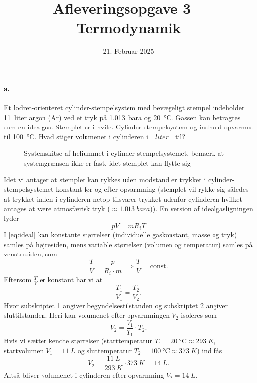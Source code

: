 \documentclass[a4paper]{article}
\title{Afleveringsopgave 3 – Termodynamik}
\date{21. Februar 2025}
\begin{document}
\maketitle


\paragraph{a.} Et lodret-orienteret cylinder-stempelsystem med bevægeligt stempel indeholder \qty{11}{liter} argon (Ar) ved et tryk på \qty{1,013}{bara} og \qty{20}{\celsius}. Gassen kan betragtes som en idealgas. Stemplet er i hvile. Cylinder-stempel\-system og indhold opvarmes til \qty{100}{\celsius}. Hvad stiger volumenet i cylinderen i $[\unit{liter}]$ til?
\bigbreak
\begin{figure}[ht]
    \centering
    \caption{Systemskitse af heliummet i cylinder-stempelsystemet, bemærk at systemgrænsen ikke er fast, idet stemplet kan flytte sig}
    \label{fig:a2_1}
\end{figure}
Idet vi antager at stemplet kan rykkes uden modstand er trykket i cylinder-stempelsystemet konstant før og efter opvarmning (stemplet vil rykke sig således at trykket inden i cylinderen netop tilsvarer trykket udenfor cylinderen hvilket antages at være atmosfærisk tryk ($\approx\qty{1,013}{bara}$)). En version af idealgasligningen lyder
\begin{equation} \label{eq:ideal}
 pV = m R_i T
\end{equation}
I \autoref{eq:ideal} kan konstante størrelser (individuelle gaskonstant, masse og tryk) samles på højresiden, mens variable størrelser (volumen og temperatur) samles på venstresiden, som
\[ 
   \frac{T}{V} = \frac{p}{R_i \cdot m} \implies \frac{T}{V} = \mathrm{const}
.\]
Eftersom $\frac{T}{V}$ er konstant har vi at
\[ 
\frac{T_1}{V_1} = \frac{T_2}{V_2}
.\]
Hvor subskriptet 1 angiver begyndelsestilstanden og subskriptet 2 angiver sluttilstanden. Heri kan volumenet efter opvarmningen $V_2$ isoleres som
\[ 
V_2 = \frac{V_1}{T_1} \cdot T_2
.\]
Hvis vi sætter kendte størrelser (starttemperatur $T_1 = \qty{20}{\celsius} \approx \qty{293}{K}$, startvolumen $V_1 = \qty{11}{L}$ og sluttemperatur $T_2 = \qty{100}{\celsius} \approx \qty{373}{K}$) ind fås
\[ 
V_2 = \frac{\qty{11}{L}}{\qty{293}{K}} \cdot \qty{373}{K} = \qty{14}{L}
.\]
Altså bliver volumenet i cylinderen efter opvarmning \underline{\underline{$V_2 = \qty{14}{L}$}}.
\end{document}
